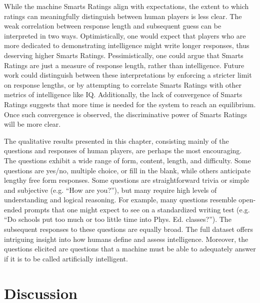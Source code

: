 While the machine Smarts Ratings align with expectations, the extent to which ratings can meaningfully distinguish between human players is less clear. The weak correlation between response length and subsequent guess can be interpreted in two ways. Optimistically, one would expect that players who are more dedicated to demonstrating intelligence might write longer responses, thus deserving higher Smarts Ratings. Pessimistically, one could argue that Smarts Ratings are just a measure of response length, rather than intelligence. Future work could distinguish between these interpretations by enforcing a stricter limit on response lengths, or by attempting to correlate Smarts Ratings with other metrics of intelligence like IQ. Additionally, the lack of convergence of Smarts Ratings suggests that more time is needed for the system to reach an equilibrium. Once such convergence is observed, the discriminative power of Smarts Ratings will be more clear.

The qualitative results presented in this chapter, consisting mainly of the questions and responses of human players, are perhaps the most encouraging. The questions exhibit a wide range of form, content, length, and difficulty. Some questions are yes/no, multiple choice, or fill in the blank, while others anticipate lengthy free form responses. Some questions are straightforward trivia or simple and subjective (e.g. ``How are you?''), but many require high levels of understanding and logical reasoning. For example, many questions resemble open-ended prompts that one might expect to see on a standardized writing test (e.g. ``Do schools put too much or too little time into Phys. Ed. classes?''). The subsequent responses to these questions are equally broad. The full dataset offers intriguing insight into how humans define and assess intelligence. Moreover, the questions elicited are questions that a machine must be able to adequately answer if it is to be called artificially intelligent.

\section{Discussion}

